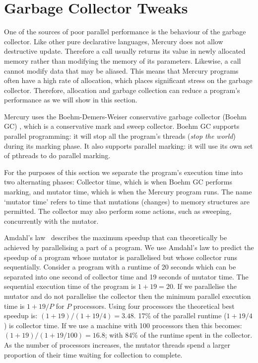 
\section{Garbage Collector Tweaks}
\label{sec:rts_gc}

One of the sources of poor parallel performance is the behaviour of the
garbage collector.
Like other pure declarative languages,
Mercury does not allow destructive update.
Therefore a call usually returns its value in newly allocated memory
rather than modifying the memory of its parameters.
Likewise, a call cannot modify data that may be aliased.
This means that Mercury programs often have a high rate of allocation,
which places significant stress on the garbage collector.
Therefore,
allocation and garbage collection can reduce a program's
performance as we will show in this section.

Mercury uses the Boehm-Demers-Weiser conservative garbage collector (Boehm GC)
\citep{boehm:1988:gc},
which is a conservative mark and sweep collector.
Boehm GC supports parallel programming:
it will stop all the program's threads (\emph{stop the world}) during its
marking phase.
It also supports parallel marking:
it will use its own set of pthreads to do parallel marking.

For the purposes of this section
we separate the program's execution time into two alternating phases:
Collector time, which is when Boehm GC performs marking,
and mutator time, which is when the Mercury program runs.
The name `mutator time' refers to time that mutations (changes) to memory
structures are permitted.
The collector may also perform some actions,
such as sweeping,
concurrently with the mutator.

Amdahl's law~\citep{amdahl:1967:law} describes the maximum speedup that
can theoretically be achieved by parallelising a part of a program.
We use Amdahl's law to predict the speedup of a program whose
mutator is parallelised but whose collector runs sequentially.
Consider a program with a runtime of 20 seconds
which can be separated into one second of collector time and 19 seconds
of mutator time.
The sequential execution time of the program is $1 + 19 = 20$.
If we parallelise the mutator and do not parallelise the
collector then the minimum parallel execution time is $1 + 19/P$
for $P$ processors.
Using four processors the theoretical best speedup is:
$(1 + 19) / (1 + 19/4) = 3.48$.
17\% of the parallel runtime ($1 + 19/4$) is collector time.
If we use a machine with 100 processors then this becomes:
$(1 + 19) / (1 + 19/100) = 16.8$;
with 84\% of the runtime spent in the collector.
As the number of processors increases,
the mutator threads spend a larger proportion of their time waiting for
collection to complete.

